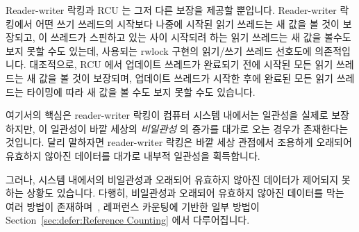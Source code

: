 Reader-writer 락킹과 RCU 는 그저 다른 보장을 제공할 뿐입니다.
Reader-writer 락킹에서 어떤 쓰기 쓰레드의 시작보다 나중에 시작된 읽기 쓰레드는
새 값을 볼 것이 보장되고, 이 쓰레드가 스핀하고 있는 사이 시작되려 하는 읽기
쓰레드는 새 값을 볼수도 보지 못할 수도 있는데, 사용되는 rwlock 구현의 읽기/쓰기
쓰레드 선호도에 의존적입니다.
대조적으로, RCU 에서 업데이트 쓰레드가 완료되기 전에 시작된 모든 읽기 쓰레드는
새 값을 볼 것이 보장되며, 업데이트 쓰레드가 시작한 후에 완료된 모든 읽기
쓰레드는 타이밍에 따라 새 값을 볼 수도 보지 못할 수도 있습니다.

여기서의 핵심은 reader-writer 락킹이 컴퓨터 시스템 내에서는 일관성을 실제로
보장하지만, 이 일관성이 바깥 세상의 \emph{비일관성} 의 증가를 대가로 오는
경우가 존재한다는 것입니다.
달리 말하자면 reader-writer 락킹은 바깥 세상 관점에서 조용하게 오래되어
유효하지 않아진 데이터를 대가로 내부적 일관성을 획득합니다.

그러나, 시스템 내에서의 비일관성과 오래되어 유효하지 않아진 데이터가 제어되지
못하는 상황도 있습니다.
다행히, 비일관성과 오래되어 유효하지 않아진 데이터를 막는 여러 방법이
존재하며~\cite{PaulEdwardMcKenneyPhD,Arcangeli03}, 레퍼런스 카운팅에 기반한
일부 방법이 Section~\ref{sec:defer:Reference Counting} 에서 다루어집니다.

